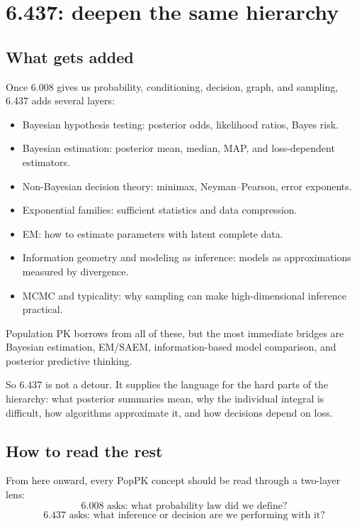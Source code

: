 \documentclass[a4paper]{article}
\begin{document}
\section{6.437: deepen the same hierarchy}

\subsection{What gets added}

Once 6.008 gives us probability, conditioning, decision, graph, and sampling, 6.437 adds several layers:

\begin{itemize}[leftmargin=2em]
  \item Bayesian hypothesis testing: posterior odds, likelihood ratios, Bayes risk.
  \item Bayesian estimation: posterior mean, median, MAP, and loss-dependent estimators.
  \item Non-Bayesian decision theory: minimax, Neyman--Pearson, error exponents.
  \item Exponential families: sufficient statistics and data compression.
  \item EM: how to estimate parameters with latent complete data.
  \item Information geometry and modeling as inference: models as approximations measured by divergence.
  \item MCMC and typicality: why sampling can make high-dimensional inference practical.
\end{itemize}

Population PK borrows from all of these, but the most immediate bridges are Bayesian estimation, EM/SAEM, information-based model comparison, and posterior predictive thinking.

So 6.437 is not a detour.  It supplies the language for the hard parts of the hierarchy: what posterior summaries mean, why the individual integral is difficult, how algorithms approximate it, and how decisions depend on loss.

\subsection{How to read the rest}

From here onward, every PopPK concept should be read through a two-layer lens:
\[
  \text{6.008 asks: what probability law did we define?}
\]
\[
  \text{6.437 asks: what inference or decision are we performing with it?}
\]
\end{document}
